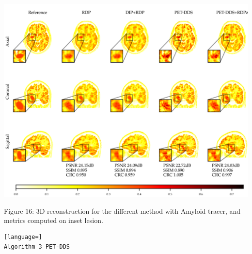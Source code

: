 \documentclass{article}
\begin{document}
\includegraphics{_page_37_Figure_1.png}


Figure 16: 3D reconstruction for the different method with Amyloid tracer, and metrics computed on inset lesion.

\begin{lstlisting}[language=]
Algorithm 3 PET-DDS
\end{lstlisting}
\end{document}
